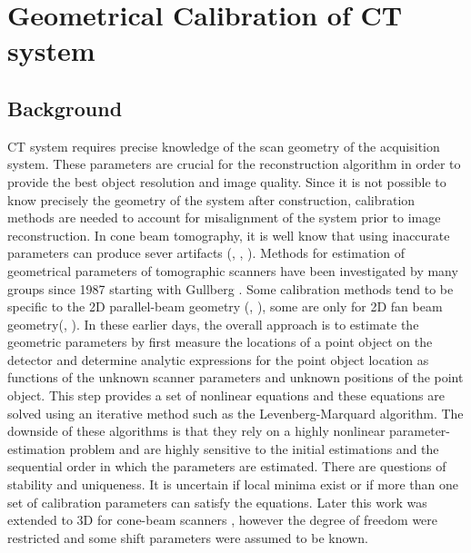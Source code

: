 \chapter{Geometrical Calibration of CT system}
\label{chap:calibration}

\section{Background}
CT system requires precise knowledge of the scan geometry of the acquisition system.  These parameters are crucial for the reconstruction algorithm in order to provide the best object resolution and image quality.  Since it is not possible to know precisely the geometry of the system after construction, calibration methods are needed to account for misalignment of the system prior to image reconstruction.  In cone beam tomography, it is well know that using inaccurate parameters can produce sever artifacts (\citep{Li1994a}, \citep{Li1994b}, \citep{Wang1998}). Methods for estimation of geometrical parameters of tomographic scanners have been investigated by many groups since 1987 starting with Gullberg \citep{Gullberg1987}.  Some calibration methods tend to be specific to the 2D parallel-beam geometry (\citep{Azevedo1990}, \citep{Busemann1987}), some are only for 2D fan beam geometry(\citep{Crawford1988}, \citep{Hsieh1999} \citep{Gullberg1987}).  In these earlier days, the overall approach is to estimate the geometric parameters by first measure the locations of a point object on the detector and determine analytic expressions for the point object location as functions of the unknown scanner parameters and unknown positions of the point object.  This step provides a set of nonlinear equations and these equations are solved using an iterative method such as the Levenberg-Marquard algorithm.  The downside of these algorithms is that they rely on a highly nonlinear parameter-estimation problem and are highly sensitive to the initial estimations and the sequential order in which the parameters are estimated.  There are questions of stability and uniqueness.  It is uncertain if local minima exist or if more than one set of calibration parameters can satisfy the equations.  Later this work was extended to 3D for cone-beam scanners \citep{Gullberg1990}, however the degree of freedom were restricted and some shift parameters were assumed to be known.


